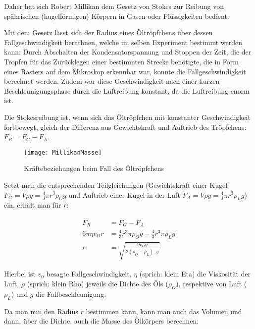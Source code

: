 Daher hat sich Robert Millikan dem Gesetz von Stokes zur Reibung von spährischen (\glqq kugelförmigen\grqq) Körpern in Gasen oder Flüssigkeiten bedient: 

Mit dem Gesetz lässt sich der Radius eines Öltröpfchens über dessen Fallgeschwindigkeit berechnen, welche im selben Experiment bestimmt werden kann: Durch Abschalten der Kondensatorspannung und Stoppen der Zeit, die der Tropfen für das Zurücklegen einer bestimmten Strecke benötigte, die in Form eines Rasters auf dem Mikroskop erkennbar war, konnte die Fallgeschwindigkeit berechnet werden. Zudem war diese Geschwindigkeit nach einer kurzen Beschleunigungsphase durch die Luftreibung konstant, da die Luftreibung enorm ist.

Die Stokesreibung ist, wenn sich das Öltröpfchen mit konstanter Geschwindigkeit fortbewegt, gleich der Differenz aus Gewichtskraft und Auftrieb des Tröpfchens: $F_R = F_G - F_A$.

\begin{figure}[h!]
	\centering
	\texttt{[image: MillikanMasse]}
	\caption{Kräftebeziehungen beim Fall des Öltröpfchens}
	\label{fig:MillikanMasse}
\end{figure}


Setzt man die entsprechenden Teilgleichungen (Gewichtskraft einer Kugel $F_G = V \rho g = \frac{4}{3} \pi r^3 \rho_{O} g$ und Auftrieb einer Kugel in der Luft $F_A = V \rho g = \frac{4}{3} \pi r^3 \rho_L g$) ein, erhält man für $r$:

\begin{align} \label{eq:StokesReibungFuerR}
\begin{split}
	F_R &= F_G - F_A \\
	6 \pi \eta v_O r &= \frac{4}{3} r^3 \pi \rho_{O} g - \frac{4}{3} r^3 \pi \rho_{L} g \\
	r &= \sqrt{\frac{9v_{O}\eta}{2(\rho_{O}-\rho_{L}) \cdot g}}
\end{split}
\end{align}

Hierbei ist $v_{0}$ besagte Fallgeschwindigkeit, $\eta$ (sprich: \glqq klein Eta\grqq) die Viskosität der Luft, $\rho$ (sprich: \glqq klein Rho\grqq) jeweils die Dichte des Öls ($\rho_O$), respektive von Luft ($\rho_L$) und $g$ die Fallbeschleunigung.

Da man nun den Radius $r$ bestimmen kann, kann man auch das Volumen und dann, über die Dichte, auch die Masse des Ölkörpers berechnen:


